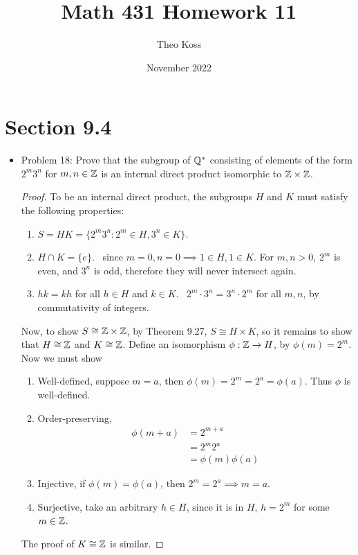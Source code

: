 \documentclass[a4paper,12pt]{extarticle}
\title{Math 431 Homework 11}
\author{Theo Koss}
\date{November 2022}
\theoremstyle{definition}
\begin{document}
\maketitle
\section{Section 9.4}
\begin{itemize}
    \item Problem 18: Prove that the subgroup of $\mathbb{Q}^*$ consisting of elements of the form $2^m3^n$ for $m, n\in\mathbb{Z}$ is an internal direct product isomorphic to $\mathbb{Z}\times\mathbb{Z}$.\begin{proof} To be an internal direct product, the subgroups $H$ and $K$ must satisfy the following properties:
    \begin{enumerate}
        \item $S=HK=\{2^m3^n:2^m\in H,3^n\in K\}$. \checkmark
        \item $H\cap K = \{e\}$. \checkmark\ since $m=0,n=0\implies 1\in H, 1\in K$. For $m,n>0$, $2^m$ is even, and $3^n$ is odd, therefore they will never intersect again. 
        \item $hk=kh$ for all $h\in H$ and $k\in K$. \checkmark\ $2^m\cdot3^n=3^n\cdot2^m$ for all $m,n$, by commutativity of integers.
    \end{enumerate}
    Now, to show $S\cong \mathbb{Z}\times\mathbb{Z}$, by Theorem 9.27, $S\cong H\times K$, so it remains to show that $H\cong \mathbb{Z}$ and $K\cong \mathbb{Z}$. Define an isomorphism $\phi:\mathbb{Z}\to H$, by $\phi(m)=2^m$. Now we must show \begin{enumerate}
        \item Well-defined, suppose $m=a$, then $\phi(m)=2^m=2^a=\phi(a)$. Thus $\phi$ is well-defined. \checkmark
        \item Order-preserving, 
        \begin{align*}
            \phi(m+a)&=2^{m+a}\\
            &=2^m2^a\\
            &=\phi(m)\phi(a)
        \end{align*}\checkmark
        \item Injective, if $\phi(m)=\phi(a)$, then $2^m=2^a\implies m=a$. \checkmark
        \item Surjective, take an arbitrary $h\in H$, since it is in $H$, $h=2^m$ for some $m\in\mathbb{Z}$. \checkmark 
    \end{enumerate}
    The proof of $K\cong\mathbb{Z}$ is similar.
    \end{proof}
\end{itemize}
\end{document}
